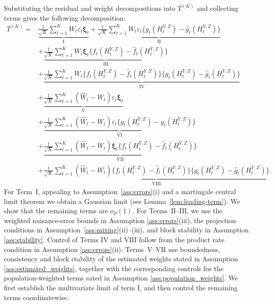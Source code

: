 \documentclass[12pt]{article}
\newcommand{\Rajen}[1]{{ \color{red} Rajen: #1}}
\numberwithin{equation}{section}
\begin{document}
Substituting the residual and weight decompositions into $T^{(K)}$ and
collecting terms gives the following decomposition:
\begin{equation}
\label{eq:hatR_decompose}
\begin{aligned}
T^{(K)}
={}&
\underbrace{\frac{1}{\sqrt K}\sum_{t=1}^K
W_t\varepsilon_t\boldsymbol\xi_t}_{\mathrm{I}}
+
\underbrace{\frac{1}{\sqrt K}\sum_{t=1}^K
W_t\varepsilon_t
\big\{g_t(H_t^{Y,Z})-\hat g_t(H_t^{Y,Z})\big\}}_{\mathrm{II}}
\\
&+
\underbrace{\frac{1}{\sqrt K}\sum_{t=1}^K
W_t\boldsymbol\xi_t
\big\{f_t(H_t^{Y,Z})-\hat f_t(H_t^{Y,Z})\big\}}_{\mathrm{III}}
\\
&+
\underbrace{\frac{1}{\sqrt K}\sum_{t=1}^K
W_t
\big\{f_t(H_t^{Y,Z})-\hat f_t(H_t^{Y,Z})\big\}
\big\{g_t(H_t^{Y,Z})-\hat g_t(H_t^{Y,Z})\big\}}_{\mathrm{IV}}
\\
&+
\underbrace{\frac{1}{\sqrt K}\sum_{t=1}^K
(\hat W_t-W_t)\varepsilon_t\boldsymbol\xi_t}_{\mathrm{V}}
\\
&+
\underbrace{\frac{1}{\sqrt K}\sum_{t=1}^K
(\hat W_t-W_t)\varepsilon_t
\big\{g_t(H_t^{Y,Z})-\hat g_t(H_t^{Y,Z})\big\}}_{\mathrm{VI}}
\\
&+
\underbrace{\frac{1}{\sqrt K}\sum_{t=1}^K
(\hat W_t-W_t)\boldsymbol\xi_t
\big\{f_t(H_t^{Y,Z})-\hat f_t(H_t^{Y,Z})\big\}}_{\mathrm{VII}}
\\
&+
\underbrace{\frac{1}{\sqrt K}\sum_{t=1}^K
(\hat W_t-W_t)
\big\{f_t(H_t^{Y,Z})-\hat f_t(H_t^{Y,Z})\big\}
\big\{g_t(H_t^{Y,Z})-\hat g_t(H_t^{Y,Z})\big\}}_{\mathrm{VIII}} .
\end{aligned}
\end{equation}
For Term~\(\mathrm I\), appealing to Assumption~\ref{ass:errors}(i) and a
 martingale central limit theorem we obtain a Gaussian limit (see Lemma~\ref{lem:leading-term}). We show that the remaining terms are $o_P(1)$. For Terms~\(\mathrm{II}\)--\(\mathrm{III}\), we
use the weighted nuisance-error bounds in Assumption \ref{ass:errors}(iii), the projection conditions in
Assumption~\ref{ass:mixing}(ii)--(iii), and block stability in Assumption \ref{ass:stability}. Control of Terms
\(\mathrm{IV}\) and \(\mathrm{VIII}\) follow from the product
rate condition in Assumption \ref{ass:errors}(ii). Terms~\(\mathrm V\)--\(\mathrm{VII}\) use boundedness, consistency
and block stability of the estimated weights stated in Assumption \ref{ass:estimated_weights}, together with the corresponding
controls for the population-weighted terms sated in Assumption \ref{ass:population_weights}. 
We first establish the multivariate limit of term \(\mathrm{I}\), and then
control the remaining terms coordinatewise.
\end{document}
